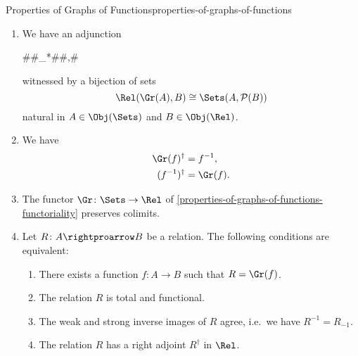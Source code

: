 \begin{proposition}{Properties of Graphs of Functions}{properties-of-graphs-of-functions}
\begin{enumerate}
            in $\sfbfRel$, where $f^{-1}$ is the inverse of $f$ of \cref{the-inverse-of-a-function}.
        \item\label{properties-of-graphs-of-functions-adjointness}We have an adjunction
            \begin{webcompile}
                \Adjunction#\Gr#_{*}#\Sets#\Rel,#
            \end{webcompile}%
            witnessed by a bijection of sets%
            \[
                \Rel(\Gr(A),B)
                \cong
                \Sets(A,\mathcal{P}(B))
            \]%
            natural in $A\in\Obj(\Sets)$ and $B\in\Obj(\Rel)$.
        \item\label{properties-of-graphs-of-functions-interaction-with-inverses}We have
            \begin{align*}
                \Gr(f)^{\dagger}   &= f^{-1},\\
                (f^{-1})^{\dagger} &= \Gr(f).
            \end{align*}
        \item\label{properties-of-graphs-of-functions-cocontinuity}The functor $\Gr\colon\Sets\to\Rel$ of \cref{properties-of-graphs-of-functions-functoriality} preserves colimits.
        \item\label{properties-of-graphs-of-functions-characterisations}Let $R\colon A\rightproarrow B$ be a relation. The following conditions are equivalent:
            \begin{enumerate}
                \item\label{properties-of-graphs-of-functions-characterisations-1}There exists a function $f\colon A\to B$ such that $R=\Gr(f)$.
                \item\label{properties-of-graphs-of-functions-characterisations-2}The relation $R$ is total and functional.
                \item\label{properties-of-graphs-of-functions-characterisations-3}The weak and strong inverse images of $R$ agree, i.e.\ we have $R^{-1}=R_{-1}$.
                \item\label{properties-of-graphs-of-functions-characterisations-4}The relation $R$ has a right adjoint $R^{\dagger}$ in $\Rel$.
            \end{enumerate}
    \end{enumerate}
\end{proposition}
